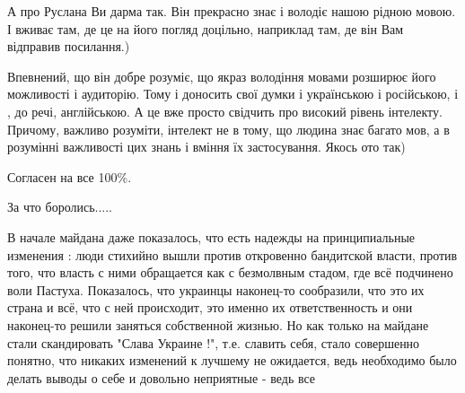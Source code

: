 \begin{itemize}
\begin{itemize}
А про Руслана Ви дарма так. Він прекрасно знає і володіє нашою рідною мовою. І
вживає там, де це на його погляд доцільно, наприклад там, де він Вам відправив
посилання.)

Впевнений, що він добре розуміє, що якраз володіння мовами розширює його
можливості і аудиторію. Тому і доносить свої думки і українською і російською,
і , до речі, англійською. А це вже просто свідчить про високий рівень
інтелекту. Причому, важливо розуміти, інтелект не в тому, що людина знає багато
мов, а в розумінні важливості цих знань і вміння їх застосування. Якось ото
так)

\end{itemize} %

Согласен на все 100\%.

За что боролись.....


В начале майдана даже показалось, что есть надежды на принципиальные изменения
: люди стихийно вышли против откровенно бандитской власти, против того, что
власть с ними обращается как с безмолвным стадом, где всё подчинено воли
Пастуха. Показалось, что украинцы наконец-то сообразили, что это их страна и
всё, что с ней происходит, это именно их ответственность и они наконец-то
решили заняться собственной жизнью. Но как только на майдане стали скандировать
"Слава Украине !", т.е. славить себя, стало совершенно понятно, что никаких
изменений к лучшему не ожидается, ведь необходимо было делать выводы о себе и
довольно неприятные - ведь все

\end{itemize} %
